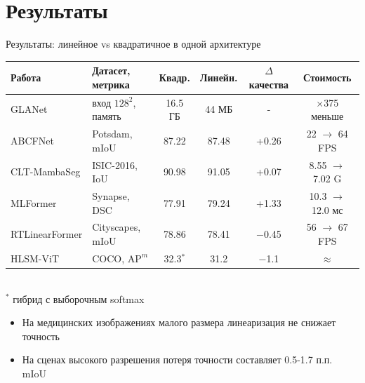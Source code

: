\documentclass[10pt,aspectratio=169]{beamer}
\newcommand{\up}{\textcolor{green!50!black}}
\newcommand{\down}{\textcolor{red!70!black}}
\begin{document}
\section{Результаты}
\begin{frame}{Результаты: линейное vs квадратичное в одной архитектуре}
  \centering
  \footnotesize
  \begin{tabular}{llcccc}
    \toprule
    Работа & Датасет, метрика & Квадр. & Линейн. & $\Delta$ качества & Стоимость \\
    \midrule
    GLANet & вход $128^2$, память & 16.5 ГБ & 44 МБ & - & \up{$\times$375 меньше} \\
    ABCFNet & Potsdam, mIoU & 87.22 & 87.48 & \up{+0.26} & \up{22 $\to$ 64 FPS} \\
    CLT-MambaSeg & ISIC-2016, IoU & 90.98 & 91.05 & \up{+0.07} & \up{8.55 $\to$ 7.02 G} \\
    MLFormer & Synapse, DSC & 77.91 & 79.24 & \up{+1.33} & \down{10.3 $\to$ 12.0 мс} \\
    RTLinearFormer & Cityscapes, mIoU & 78.86 & 78.41 & \down{$-$0.45} & \up{56 $\to$ 67 FPS} \\
    HLSM-ViT & COCO, $\mathrm{AP}^{m}$ & 32.3$^*$ & 31.2 & \down{$-$1.1} & $\approx$ \\
    \bottomrule
  \end{tabular}\\[2pt]
  {\scriptsize $^*$ гибрид с выборочным softmax}
  \vspace{0.4cm}
  \begin{itemize}
    \item На медицинских изображениях малого размера линеаризация не снижает точность
    \item На сценах высокого разрешения потеря точности составляет 0.5-1.7 п.п. mIoU
  \end{itemize}
\end{frame}
\end{document}
